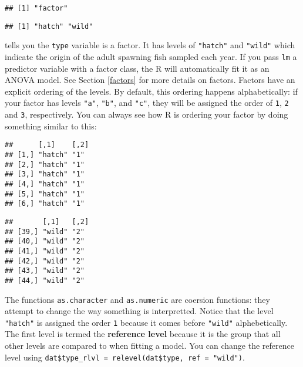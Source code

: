 \documentclass[]{book}
\newenvironment{Shaded}{\begin{snugshade}}{\end{snugshade}}
\newcommand{\KeywordTok}[1]{\textcolor[rgb]{0.13,0.29,0.53}{\textbf{#1}}}
\newcommand{\StringTok}[1]{\textcolor[rgb]{0.31,0.60,0.02}{#1}}
\newcommand{\OperatorTok}[1]{\textcolor[rgb]{0.81,0.36,0.00}{\textbf{#1}}}
\newcommand{\NormalTok}[1]{#1}
\theoremstyle{definition}
\theoremstyle{definition}
\theoremstyle{definition}
\theoremstyle{remark}
\begin{document}
\begin{verbatim}
## [1] "factor"
\end{verbatim}

\begin{verbatim}
## [1] "hatch" "wild"
\end{verbatim}

tells you the \texttt{type} variable is a factor. It has levels of
\texttt{"hatch"} and \texttt{"wild"} which indicate the origin of the
adult spawning fish sampled each year. If you pass \texttt{lm} a
predictor variable with a factor class, the R will automatically fit it
as an ANOVA model. See Section \ref{factors} for more details on
factors. Factors have an explicit ordering of the levels. By default,
this ordering happens alphabetically: if your factor has levels
\texttt{"a"}, \texttt{"b"}, and \texttt{"c"}, they will be assigned the
order of \texttt{1}, \texttt{2} and \texttt{3}, respectively. You can
always see how R is ordering your factor by doing something similar to
this:

\begin{Shaded}
\end{Shaded}

\begin{verbatim}
##      [,1]    [,2]
## [1,] "hatch" "1" 
## [2,] "hatch" "1" 
## [3,] "hatch" "1" 
## [4,] "hatch" "1" 
## [5,] "hatch" "1" 
## [6,] "hatch" "1"
\end{verbatim}

\begin{verbatim}
##       [,1]   [,2]
## [39,] "wild" "2" 
## [40,] "wild" "2" 
## [41,] "wild" "2" 
## [42,] "wild" "2" 
## [43,] "wild" "2" 
## [44,] "wild" "2"
\end{verbatim}

The functions \texttt{as.character} and \texttt{as.numeric} are coersion
functions: they attempt to change the way something is interpretted.
Notice that the level \texttt{"hatch"} is assigned the order \texttt{1}
because it comes before \texttt{"wild"} alphebetically. The first level
is termed the \textbf{reference level} because it is the group that all
other levels are compared to when fitting a model. You can change the
reference level using
\texttt{dat\$type\_rlvl\ =\ relevel(dat\$type,\ ref\ =\ "wild")}.
\end{document}
